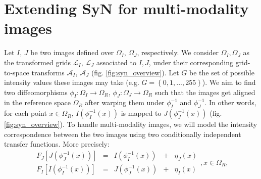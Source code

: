 \section{Extending SyN for multi-modality images}\label{sec:syn_em}

Let $I$, $J$ be two images defined over $\Omega_{I}$, $\Omega_{J}$, respectively. We consider $\Omega_{I}, \Omega_{J}$ as the transformed grids $\mathcal{L}_{I}$, $\mathcal{L}_{J}$
associated to $I, J$, under their corresponding grid-to-space transforms $\mathcal{A}_{I}$, $\mathcal{A}_{J}$ (fig. \ref{fig:syn_overview}). Let $G$ be the set of possible intensity
values these images may take (e.g. $G=\left\lbrace 0,1,...,255\right\rbrace$). We aim to find two diffeomorphisms
$\phi_{I}:\Omega_{I}\rightarrow \Omega_{R}$, $\phi_{J}:\Omega_{J}\rightarrow \Omega_{R}$ such that the images get aligned in the reference space $\Omega_{R}$
after warping them under $\phi_{I}^{-1}$ and $\phi_{J}^{-1}$. In other words, for each point $x \in \Omega_{R}$, $I(\phi_{I}^{-1}(x))$ is mapped to $J(\phi_{J}^{-1}(x))$
(fig. \ref{fig:syn_overview}). To handle multi-modality images, we will model the intensity correspondence between the two images using two conditionally independent transfer functions.
More precisely:
\begin{equation}\label{eq:SyNEM_gom_ref}
    \begin{array}{ccccc}
        F_{J}\left[J(\phi_{J}^{-1}(x))\right] &=& I(\phi_{I}^{-1}(x)) &+& \eta_{J}(x)\\
        F_{I}\left[I(\phi_{I}^{-1}(x))\right] &=& J(\phi_{J}^{-1}(x)) &+& \eta_{I}(x)
    \end{array}, x\in\Omega_{R},
\end{equation}

